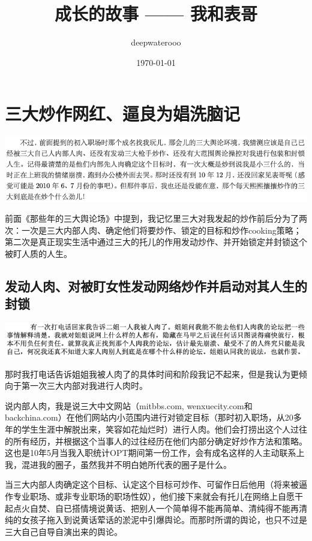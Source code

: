\documentclass[9pt, b5paper]{article}
\author{deepwaterooo}
\date{\today}
\title{成长的故事 —— 我和表哥}
\begin{document}
\maketitle
\tableofcontents


\section{三大炒作网红、逼良为娼洗脑记}
\label{sec:org7fb45d9}

\begin{center}
\includegraphics[width=.9\linewidth]{./pic/pfp60.png}
\end{center}

前面《那些年的三大舆论场》中提到，我记忆里三大对我发起的炒作前后分为了两次：一次是三大内部人肉、确定他们将要炒作、锁定的目标和炒作cooking策略；第二次是真正现实生活中通过三大的托儿的作用发动炒作、并开始锁定并封锁这个被盯人质的人生。

\subsection{发动人肉、对被盯女性发动网络炒作并启动对其人生的封锁}
\label{sec:org5338f6b}

\begin{center}
\includegraphics[width=.9\linewidth]{./pic/p1p51-2.png}
\end{center}

那时我打电话告诉姐姐我被人肉了的具体时间和阶段我记不起来，但是我认为更倾向于第一次三大内部对我进行人肉时。

说内部人肉，我是说三大中文网站（mitbbs.com, wenxuecity.com和backchina.com）在他们网站内小范围内进行对锁定目标（那时初入职场，从20多年的学生生涯中解脱出来，笑容如花灿烂时）进行人肉。他们会打捞出这个人过往的所有经历，并根据这个当事人的过往经历在他们内部分确定好炒作方法和策略。这也是10年5月当我入职统计OPT期间第一份工作，会有成名这样的人主动联系上我，混进我的圈子，虽然我并不明白她所代表的圈子是什么。 

当三大内部人肉确定这个目标、认定这个目标可炒作、可留作日后他用（将来被逼作专业职场、或非专业职场的职场性奴），他们接下来就会有托儿在网络上自愿干起点火自焚、自已搭情境说黄话、把别人一个简单得不能再简单、清纯得不能再清纯的女孩子拖入到说黄话荤话的淤泥中引爆舆论。而那时所谓的舆论，也只不过是三大自己自导自演出来的舆论。
\end{document}

